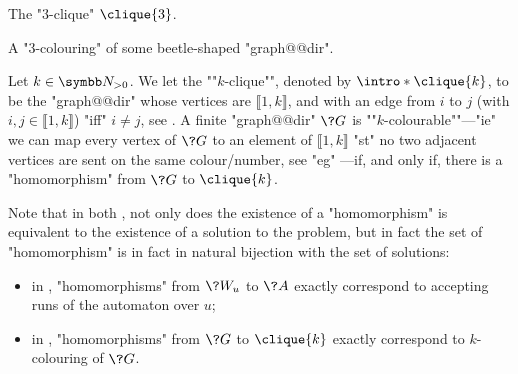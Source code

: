 \begin{marginfigure}
	\centering
	\begin{tikzpicture}
		
	\end{tikzpicture}
	\caption{
		\AP\label{fig:intro-3-clique}
		The "$3$-clique" $\clique{3}$.
	}
\end{marginfigure}
\begin{marginfigure}
	\centering
	\begin{tikzpicture}
		
	\end{tikzpicture}
	\caption{
		\AP\label{fig:dichotomy-ex-3-clique}
		A "$3$-colouring" of some beetle-shaped "graph@@dir".
	}
\end{marginfigure}
\begin{example}
	\AP\label{ex:graph-colouring-as-hom}
	Let $k\in\Np$. We let the \AP""$k$-clique"", denoted by $\intro*\clique{k}$,
	to be the "graph@@dir" whose vertices are $\lBrack 1,k\rBrack$,
	and with an edge from $i$ to $j$ (with $i,j \in \lBrack 1,k\rBrack$)
	"iff" $i\neq j$, see .
	A finite "graph@@dir" $\?G$ is \AP""$k$-colourable""---"ie"
	we can map every vertex of $\?G$ to an element of $\lBrack 1,k\rBrack$
	"st" no two adjacent vertices are sent on the same colour/number,
	see "eg" ---if,
	and only if, there is a "homomorphism" from $\?G$ to $\clique{k}$.
\end{example}

Note that in both ,
not only does the existence of a "homomorphism" is equivalent to the existence
of a solution to the problem, but in fact the set of "homomorphism" is in fact
in natural bijection with the set of solutions:
\begin{itemize}
	\item in , "homomorphisms" from $\?W_u$ to $\?A$
		exactly correspond to accepting runs of the automaton over $u$;
	\item in , "homomorphisms" from $\?G$ to $\clique{k}$
		exactly correspond to $k$-colouring of $\?G$.
\end{itemize}

